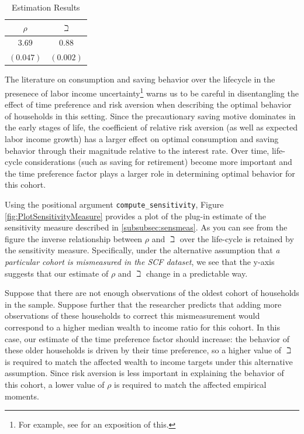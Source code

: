 \documentclass[titlepage, headings=optiontotocandhead]{econtex}
\begin{document}
  \begin{table}[h]
    \caption{Estimation Results}\label{tab:EstResults}
    \center
    \begin{tabular}{cc}
      \hline
      $\rho $ & $\beth$\\
      \hline
      $3.69$ & $0.88$\\
      $(0.047)$ & $(0.002)$\\
      \hline
    \end{tabular}
  \end{table}

The literature on consumption and saving behavior over the lifecycle in the presenece of labor income uncertainty\footnote{For example, see \cite{gpLifecycle} for an exposition of this.} warns us to be careful in disentangling the effect of time preference and risk aversion when describing the optimal behavior of households in this setting.  Since the precautionary saving motive dominates in the early stages of life, the coefficient of relative risk aversion (as well as expected labor income growth) has a larger effect on optimal consumption and saving behavior through their magnitude relative to the interest rate. Over time, life-cycle considerations (such as saving for retirement) become more important and the time preference factor plays a larger role in determining optimal behavior for this cohort.

Using the positional argument \texttt{compute\_sensitivity}, Figure \ref{fig:PlotSensitivityMeasure} provides a plot of the plug-in estimate of the sensitivity measure described in \ref{subsubsec:sensmeas}. As you can see from the figure the inverse relationship between $\rho$ and $\beth$ over the life-cycle is retained by the sensitivity measure. Specifically, under the alternative assumption that \textit{a particular cohort is mismeasured in the SCF dataset}, we see that the y-axis suggests that our estimate of $\rho$ and $\beth$ change in a predictable way.

Suppose that there are not enough observations of the oldest cohort of households in the sample. Suppose further that the researcher predicts that adding more observations of these households to correct this mismeasurement would correspond to a higher median wealth to income ratio for this cohort. In this case, our estimate of the time preference factor should increase: the behavior of these older households is driven by their time preference, so a higher value of $\beth$ is required to match the affected wealth to income targets under this alternative assumption. Since risk aversion is less important in explaining the behavior of this cohort, a lower value of $\rho$ is required to match the affected empirical moments.
\end{document}
